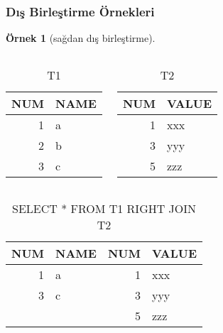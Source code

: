 \documentclass[dvipsnames]{beamer}
\theoremstyle{definition}
\theoremstyle{example}
\newtheorem{ornek}[theorem]{Örnek}
\theoremstyle{plain}
\begin{document}
\begin{frame}[fragile]
  \frametitle{Dış Birleştirme Örnekleri}

  \begin{ornek}[sağdan dış birleştirme]
    \begin{columns}[t]
      \begin{tiny}
      \begin{table}
        \caption{T1}
        \begin{tabular}{|r|l|}\hline
NUM & NAME\\\hline\hline
  1 & a   \\\hline
  2 & b   \\\hline
  3 & c   \\\hline
        \end{tabular}
      \end{table}
      \end{tiny}

      \begin{tiny}
      \begin{table}
        \caption{T2}
        \begin{tabular}{|r|l|}\hline
NUM & VALUE\\\hline\hline
  1 & xxx  \\\hline
  3 & yyy  \\\hline
  5 & zzz  \\\hline
        \end{tabular}
      \end{table}
      \end{tiny}
    \end{columns}

    \pause
    \begin{center}
      \begin{tiny}
      \begin{table}
        \caption{SELECT * FROM T1 RIGHT JOIN T2}
        \begin{tabular}{|r|l|r|l|}\hline
NUM & NAME & NUM & VALUE\\\hline\hline
  1 & a    &   1 & xxx  \\\hline
  3 & c    &   3 & yyy  \\\hline
    &      &   5 & zzz  \\\hline
        \end{tabular}
      \end{table}
      \end{tiny}
    \end{center}
  \end{ornek}
\end{frame}
\end{document}
